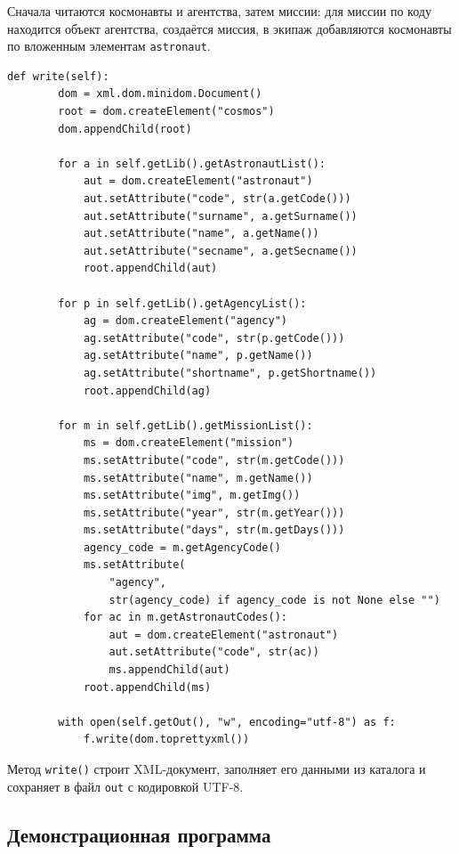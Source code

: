 \documentclass[a4paper,14pt]{extarticle}
\begin{document}
Сначала читаются космонавты и агентства, затем миссии: для миссии по коду находится объект агентства, создаётся миссия, в экипаж добавляются космонавты по вложенным элементам \texttt{astronaut}.

\begin{lstlisting}[caption={Модуль \texttt{dataxml.py}: метод \texttt{write()}}]
    def write(self):
        dom = xml.dom.minidom.Document()
        root = dom.createElement("cosmos")
        dom.appendChild(root)

        for a in self.getLib().getAstronautList():
            aut = dom.createElement("astronaut")
            aut.setAttribute("code", str(a.getCode()))
            aut.setAttribute("surname", a.getSurname())
            aut.setAttribute("name", a.getName())
            aut.setAttribute("secname", a.getSecname())
            root.appendChild(aut)

        for p in self.getLib().getAgencyList():
            ag = dom.createElement("agency")
            ag.setAttribute("code", str(p.getCode()))
            ag.setAttribute("name", p.getName())
            ag.setAttribute("shortname", p.getShortname())
            root.appendChild(ag)

        for m in self.getLib().getMissionList():
            ms = dom.createElement("mission")
            ms.setAttribute("code", str(m.getCode()))
            ms.setAttribute("name", m.getName())
            ms.setAttribute("img", m.getImg())
            ms.setAttribute("year", str(m.getYear()))
            ms.setAttribute("days", str(m.getDays()))
            agency_code = m.getAgencyCode()
            ms.setAttribute(
                "agency",
                str(agency_code) if agency_code is not None else "")
            for ac in m.getAstronautCodes():
                aut = dom.createElement("astronaut")
                aut.setAttribute("code", str(ac))
                ms.appendChild(aut)
            root.appendChild(ms)

        with open(self.getOut(), "w", encoding="utf-8") as f:
            f.write(dom.toprettyxml())
\end{lstlisting}

Метод \texttt{write()} строит XML-документ, заполняет его данными из каталога и сохраняет в файл \texttt{out} с кодировкой UTF-8.

\subsection{Демонстрационная программа}
\end{document}
